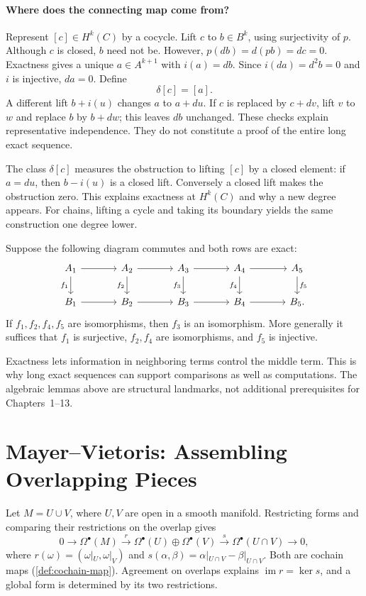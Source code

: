\paragraph{Where does the connecting map come from?}
Represent $[c]\in H^k(C)$ by a cocycle. Lift $c$ to $b\in B^k$, using
surjectivity of $p$. Although $c$ is closed, $b$ need not be. However,
$p(db)=d(pb)=dc=0$. Exactness gives a unique $a\in A^{k+1}$ with
$i(a)=db$. Since $i(da)=d^2b=0$ and $i$ is injective, $da=0$. Define
\[
\delta[c]=[a].
\]
A different lift $b+i(u)$ changes $a$ to $a+du$. If $c$ is replaced by
$c+dv$, lift $v$ to $w$ and replace $b$ by $b+dw$; this leaves $db$
unchanged. These checks explain representative independence.
They do not constitute a proof of the entire long exact sequence.

The class $\delta[c]$ measures the obstruction to lifting $[c]$ by a
closed element: if $a=du$, then $b-i(u)$ is a closed lift. Conversely a
closed lift makes the obstruction zero. This explains exactness at
$H^k(C)$ and why a new degree appears. For chains, lifting a cycle and
taking its boundary yields the same construction one degree lower.

\begin{theorem}
\label{thm:five-lemma}
Suppose the following diagram commutes and both rows are exact:
\[
\begin{tikzcd}[column sep=large]
A_1\arrow[r]\arrow[d,"f_1"']&A_2\arrow[r]\arrow[d,"f_2"']&A_3\arrow[r]\arrow[d,"f_3"']&A_4\arrow[r]\arrow[d,"f_4"']&A_5\arrow[d,"f_5"]\\
B_1\arrow[r]&B_2\arrow[r]&B_3\arrow[r]&B_4\arrow[r]&B_5.
\end{tikzcd}
\]
If $f_1,f_2,f_4,f_5$ are isomorphisms, then $f_3$ is an isomorphism.
More generally it suffices that $f_1$ is surjective, $f_2,f_4$ are
isomorphisms, and $f_5$ is injective.
\end{theorem}
Exactness lets information in neighboring terms control the middle term.
This is why long exact sequences can support comparisons as well as
computations. The algebraic lemmas above are structural landmarks, not
additional prerequisites for Chapters~1--13.

\section{Mayer--Vietoris: Assembling Overlapping Pieces}
\label{sec:de-rham-mayer-vietoris}
Let $M=U\cup V$, where $U,V$ are open in a smooth manifold. Restricting
forms and comparing their restrictions on the overlap gives
\[
0\longrightarrow\Omega^\bullet(M)\xrightarrow{r}
\Omega^\bullet(U)\oplus\Omega^\bullet(V)\xrightarrow{s}
\Omega^\bullet(U\cap V)\longrightarrow0,
\]
where $r(\omega)=(\omega|_U,\omega|_V)$ and
$s(\alpha,\beta)=\alpha|_{U\cap V}-\beta|_{U\cap V}$.
Both are cochain maps (\cref{def:cochain-map}). Agreement on overlaps
explains $\operatorname{im}r=\ker s$, and a global form is determined
by its two restrictions.


